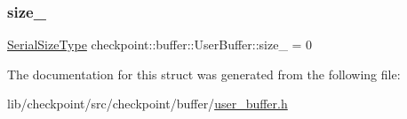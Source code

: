 \mbox{\label{structcheckpoint_1_1buffer_1_1_user_buffer_ab7b3c105260719bef32d955384279722}} 
\subsubsection{\texorpdfstring{size\+\_\+}{size\_}}
{\footnotesize\ttfamily \hyperlink{namespacecheckpoint_a083f6674da3f94c2901b18c6d238217c}{Serial\+Size\+Type} checkpoint\+::buffer\+::\+User\+Buffer\+::size\+\_\+ = 0\hspace{0.3cm}{\ttfamily [private]}}



The documentation for this struct was generated from the following file\+:\begin{DoxyCompactItemize}
\item 
lib/checkpoint/src/checkpoint/buffer/\hyperlink{user__buffer_8h}{user\+\_\+buffer.\+h}\end{DoxyCompactItemize}
